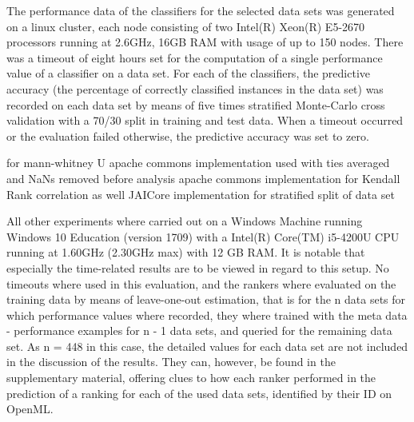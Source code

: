 
The performance data of the classifiers for the selected data sets was generated on a linux cluster, each node consisting of two Intel(R) Xeon(R) E5-2670 processors running at 2.6GHz, 16GB RAM with usage of up to 150 nodes. There was a timeout of eight hours set for the computation of a single performance value of a classifier on a data set. For each of the classifiers, the predictive accuracy (the percentage of correctly classified instances in the data set) was recorded on each data set by means of five times stratified Monte-Carlo cross validation with a 70/30 split in training and test data. When a timeout occurred or the evaluation failed otherwise, the predictive accuracy was set to zero.

for mann-whitney U apache commons implementation used with ties averaged and NaNs removed before analysis
apache commons implementation for Kendall Rank correlation as well
JAICore implementation for stratified split of data set

All other experiments where carried out on a Windows Machine running Windows 10 Education (version 1709) with a Intel(R) Core(TM) i5-4200U CPU running at 1.60GHz (2.30GHz max) with 12 GB RAM. It is notable that especially the time-related results are to be viewed in regard to this setup. No timeouts where used in this evaluation, and the rankers where evaluated on the training data by means of leave-one-out estimation, that is for the n data sets for which performance values where recorded, they where trained with the meta data - performance examples for n - 1 data sets, and queried for the remaining data set. As n = 448 in this case, the detailed values for each data set are not included in the discussion of the results. They can, however, be found in the supplementary material, offering clues to how each ranker performed in the prediction of a ranking for each of the used data sets, identified by their ID on OpenML. 

